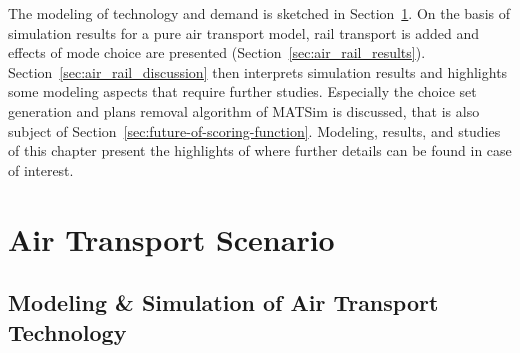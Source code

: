 The modeling of technology and demand is sketched in Section~\ref{sec:air_rail_scenario}. 
On the basis of simulation results for a pure air transport model, rail transport is added and effects of mode choice are presented (Section~\ref{sec:air_rail_results}). 
Section~\ref{sec:air_rail_discussion} then interprets simulation results and highlights some modeling aspects that require further studies. 
Especially the choice set generation and plans removal algorithm of MATSim is discussed, that is also subject of Section~\ref{sec:future-of-scoring-function}. 
Modeling, results, and studies of this chapter present the highlights of \citet[][Chapter~6, pp.~119]{Grether2014PhD} where further details can be found in case of interest.   

\section{Air Transport Scenario}
\label{sec:air_rail_scenario}
\subsection{Modeling \& Simulation of Air Transport Technology}
\label{sec:modeling-of-technology}


